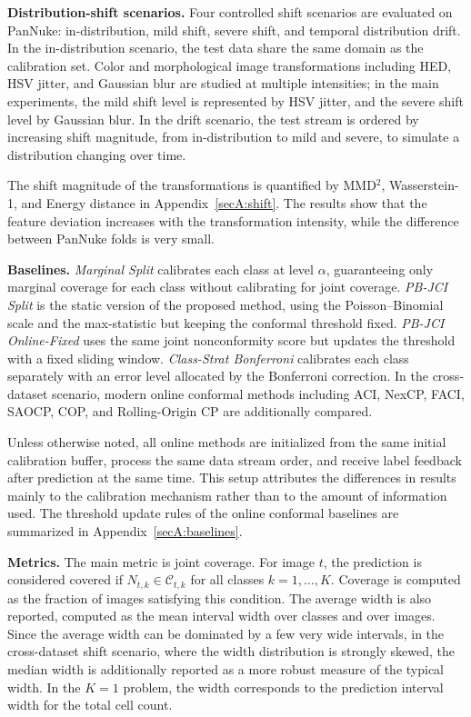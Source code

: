 \documentclass[smallextended,natbib]{svjour3}
\begin{document}
\textbf{Distribution-shift scenarios.}
Four controlled shift scenarios are evaluated on PanNuke: in-distribution, mild
shift, severe shift, and temporal distribution drift. In the in-distribution
scenario, the test data share the same domain as the calibration set. Color and
morphological image transformations including HED, HSV jitter, and Gaussian blur
are studied at multiple intensities; in the main experiments, the mild shift
level is represented by HSV jitter, and the severe shift level by Gaussian blur. In
the drift scenario, the test stream is ordered by increasing shift magnitude, from
in-distribution to mild and severe, to simulate a distribution changing over time.

The shift magnitude of the transformations is quantified by MMD\(^2\),
Wasserstein-1, and Energy distance in Appendix~\ref{secA:shift}. The results show
that the feature deviation increases with the transformation intensity, while the
difference between PanNuke folds is very small.

\textbf{Baselines.}
\emph{Marginal Split} calibrates each class at level \(\alpha\), guaranteeing only
marginal coverage for each class without calibrating for joint coverage.
\emph{PB-JCI Split} is the static version of the proposed method, using the
Poisson--Binomial scale and the max-statistic but keeping the conformal threshold
fixed. \emph{PB-JCI Online-Fixed} uses the same joint nonconformity score but
updates the threshold with a fixed sliding window. \emph{Class-Strat Bonferroni}
calibrates each class separately with an error level allocated by the Bonferroni
correction. In the cross-dataset scenario, modern online conformal methods including
ACI, NexCP, FACI, SAOCP, COP, and Rolling-Origin CP are additionally compared.

Unless otherwise noted, all online methods are initialized from the same initial
calibration buffer, process the same data stream order, and receive label feedback
after prediction at the same time. This setup attributes the differences in results
mainly to the calibration mechanism rather than to the amount of information used.
The threshold update rules of the online conformal baselines are summarized in
Appendix~\ref{secA:baselines}.

\textbf{Metrics.}
The main metric is joint coverage. For image \(t\), the prediction is considered
covered if \(N_{t,k}\in \mathcal{C}_{t,k}\) for all classes \(k=1,\dots,K\).
Coverage is computed as the fraction of images satisfying this condition. The
average width is also reported, computed as the mean interval width over classes
and over images. Since the average width can be dominated by a few very wide
intervals, in the cross-dataset shift scenario, where the width distribution is
strongly skewed, the median width is additionally reported as a more robust measure
of the typical width. In the \(K=1\) problem, the width corresponds to the prediction interval
width for the total cell count.
\end{document}
